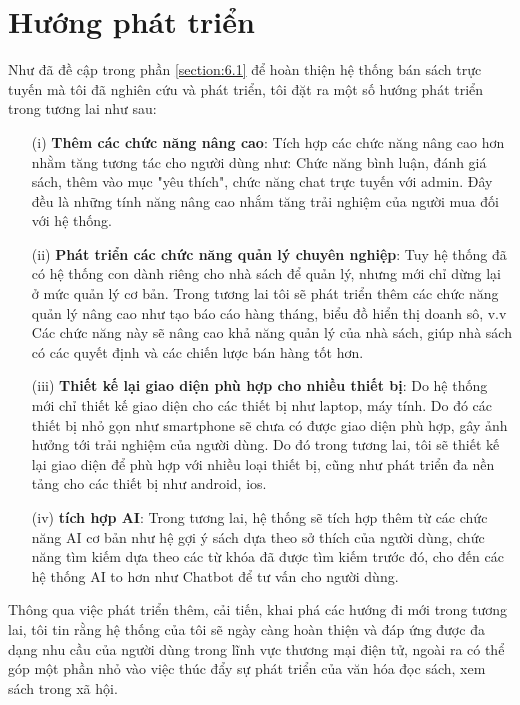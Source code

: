 \documentclass[../DoAn.tex]{subfiles}
\begin{document}
\section{Hướng phát triển}


Như đã đề cập trong phần \ref{section:6.1} để hoàn thiện hệ thống bán sách trực tuyến mà tôi đã nghiên cứu và phát triển, tôi đặt ra một số hướng phát triển trong tương lai như sau:
\begin{enumerate}
    \item[(i)] \textbf{Thêm các chức năng nâng cao}: Tích hợp các chức năng nâng cao hơn nhằm tăng tương tác cho người dùng như: Chức năng bình luận, đánh giá sách, thêm vào mục "yêu thích", chức năng chat trực tuyến với admin. Đây đều là những tính năng nâng cao nhắm tăng trải nghiệm của người mua đối với hệ thống.
    \item[(ii)] \textbf{Phát triển các chức năng quản lý chuyên nghiệp}: Tuy hệ thống đã có hệ thống con dành riêng cho nhà sách để quản lý, nhưng mới chỉ dừng lại ở mức quản lý cơ bản. Trong tương lai tôi sẽ phát triển thêm các chức năng quản lý nâng cao như tạo báo cáo hàng tháng, biểu đồ hiển thị doanh sô, v.v Các chức năng này sẽ nâng cao khả năng quản lý của nhà sách, giúp nhà sách có các quyết định và các chiến lược bán hàng tốt hơn.
    \item[(iii)] \textbf{Thiết kế lại giao diện phù hợp cho nhiều thiết bị}: Do hệ thống mới chỉ thiết kế giao diện cho các thiết bị như laptop, máy tính. Do đó các thiết bị nhỏ gọn như  smartphone sẽ chưa có được giao diện phù hợp, gây ảnh hưởng tới trải nghiệm của người dùng. Do đó trong tương lai, tôi sẽ thiết kế lại giao diện để phù hợp với nhiều loại thiết bị, cũng như phát triển đa nền tảng cho các thiết bị như android, ios.
    \item[(iv)] \textbf{tích hợp AI}: Trong tương lai, hệ thống sẽ tích hợp thêm từ các chức năng AI cơ bản như hệ gợi ý sách dựa theo sở thích của người dùng, chức năng tìm kiếm dựa theo các từ khóa đã được tìm kiếm trước đó, cho đến các hệ thống AI to hơn như Chatbot để tư vấn cho người dùng.  
\end{enumerate}

Thông qua việc phát triển thêm, cải tiến, khai phá các hướng đi mới trong tương lai, tôi tin rằng hệ thống của tôi sẽ ngày càng hoàn thiện và đáp ứng được đa dạng nhu cầu của người dùng trong lĩnh vực thương mại điện tử, ngoài ra có thể góp một phần nhỏ vào việc thúc đẩy sự phát triển của văn hóa đọc sách, xem sách trong xã hội.
\end{document}
